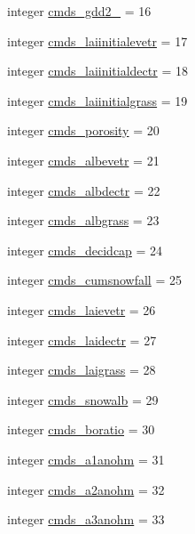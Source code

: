 \begin{DoxyCompactItemize}
\item 
integer \hyperlink{namespacecolnamesmodeldailystate_a21dad7f8e9809f4bc008d481ca7baae6}{cmds\+\_\+gdd2\+\_} = 16
\item 
integer \hyperlink{namespacecolnamesmodeldailystate_a5777d9b190fac1cf9aa6ecfb89885689}{cmds\+\_\+laiinitialevetr} = 17
\item 
integer \hyperlink{namespacecolnamesmodeldailystate_aa66f874f1b30cb2d8b55d103df157ca4}{cmds\+\_\+laiinitialdectr} = 18
\item 
integer \hyperlink{namespacecolnamesmodeldailystate_a09bb2691e70be909f17a634e348c8d06}{cmds\+\_\+laiinitialgrass} = 19
\item 
integer \hyperlink{namespacecolnamesmodeldailystate_a957bd1ccda6eb2f03bf72168b553d9dd}{cmds\+\_\+porosity} = 20
\item 
integer \hyperlink{namespacecolnamesmodeldailystate_af2fc190d2d8dff609b707af93fdbac86}{cmds\+\_\+albevetr} = 21
\item 
integer \hyperlink{namespacecolnamesmodeldailystate_a7215ae93ab4bad6d2f013107f3ab2a06}{cmds\+\_\+albdectr} = 22
\item 
integer \hyperlink{namespacecolnamesmodeldailystate_a53c82f7ef580a1b1a4310bab3f415d51}{cmds\+\_\+albgrass} = 23
\item 
integer \hyperlink{namespacecolnamesmodeldailystate_a7be9d6e61475f041e0d57ec9e05d689a}{cmds\+\_\+decidcap} = 24
\item 
integer \hyperlink{namespacecolnamesmodeldailystate_ac757dc9bd818fb0023473fdb2a740424}{cmds\+\_\+cumsnowfall} = 25
\item 
integer \hyperlink{namespacecolnamesmodeldailystate_aca4aea86be7b7a39ac147f1de44ef31d}{cmds\+\_\+laievetr} = 26
\item 
integer \hyperlink{namespacecolnamesmodeldailystate_a9fcf1fdba9e943f4f175afa5fe21e775}{cmds\+\_\+laidectr} = 27
\item 
integer \hyperlink{namespacecolnamesmodeldailystate_a304310c2408ada88dda0f8ced7fc92eb}{cmds\+\_\+laigrass} = 28
\item 
integer \hyperlink{namespacecolnamesmodeldailystate_ae49ae7c1f8b6c90134157a353a0a346d}{cmds\+\_\+snowalb} = 29
\item 
integer \hyperlink{namespacecolnamesmodeldailystate_abdab4968466e793575f276e13794bc31}{cmds\+\_\+boratio} = 30
\item 
integer \hyperlink{namespacecolnamesmodeldailystate_af1ef06d721d861a48a69d2e6188d9466}{cmds\+\_\+a1anohm} = 31
\item 
integer \hyperlink{namespacecolnamesmodeldailystate_a4450888ab830733b52d6b0d2c8832223}{cmds\+\_\+a2anohm} = 32
\item 
integer \hyperlink{namespacecolnamesmodeldailystate_a3d5abb7056671ea99f913a8956ceef91}{cmds\+\_\+a3anohm} = 33
\end{DoxyCompactItemize}


